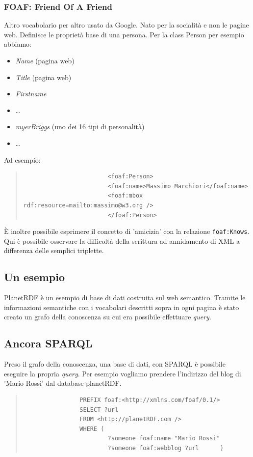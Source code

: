 				\subsubsection{FOAF: Friend Of A Friend}
					Altro vocabolario per altro usato da Google. Nato per la socialità e non le pagine web. Definisce le proprietà base di una persona. Per la class Person per esempio abbiamo:
					\begin{itemize}
						\item \emph{Name} (pagina web)
						\item \emph{Title} (pagina web)
						\item \emph{Firstname}
						\item[] \dots
						\item \emph{myerBriggs} (uno dei 16 tipi di personalità)
						\item[] \dots
					\end{itemize}
					
					Ad esempio:
					\begin{quote}
					\begin{verbatim}
						<foaf:Person>
						<foaf:name>Massimo Marchiori</foaf:name>
						<foaf:mbox rdf:resource=mailto:massimo@w3.org />
						</foaf:Person>
					\end{verbatim}
					\end{quote}	
					È inoltre possibile esprimere il concetto di 'amicizia' con la relazione \verb|foaf:Knows|. Qui è possibile osservare la difficoltà della scrittura ad annidamento di XML a differenza delle semplici triplette.
					
		\subsection{Un esempio}
			 PlanetRDF è un esempio di base di dati costruita sul web semantico. Tramite le informazioni semantiche con i vocabolari descritti sopra in ogni pagina è stato creato un grafo della conoscenza su cui era possibile effettuare \emph{query}.
		 
		 \subsection{Ancora SPARQL}
		 	Preso il grafo della conoscenza, una base di dati, con SPARQL è possibile eseguire la propria \emph{query}. Per esempio vogliamo prendere l'indirizzo del blog di 'Mario Rossi' dal database planetRDF.
		 	\begin{quote}
		 	\begin{verbatim}
		 		PREFIX foaf:<http://xmlns.com/foaf/0.1/>
		 		SELECT ?url
		 		FROM <http://planetRDF.com />
		 		WHERE (
		 				?someone foaf:name "Mario Rossi"
		 				?someone foaf:webblog ?url		)
		 	\end{verbatim}
			\end{quote}
			
